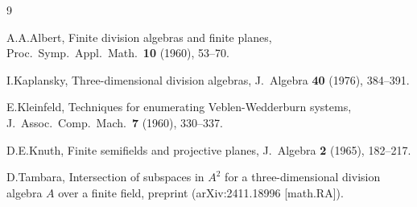 \documentclass{article}
\begin{document}
\begin{thebibliography}{9}


A.A.Albert, Finite division algebras and finite planes,
Proc.\ Symp.\ Appl.\ Math.\  \textbf{10} (1960), 53--70.

I.Kaplansky, Three-dimensional division algebras, J.\ Algebra \textbf{40} (1976), 384--391.

E.Kleinfeld, Techniques for enumerating Veblen-Wedderburn systems, J.\ Assoc.\ Comp.\ Mach.\  \textbf{7} (1960), 330--337.


D.E.Knuth, Finite semifields and projective planes, J.\ Algebra \textbf{2} (1965), 182--217.

D.Tambara, Intersection of subspaces in $A^2$ for a three-dimensional division algebra $A$ over a finite field, preprint (arXiv:2411.18996 [math.RA]).

\end{thebibliography}
\end{document}

